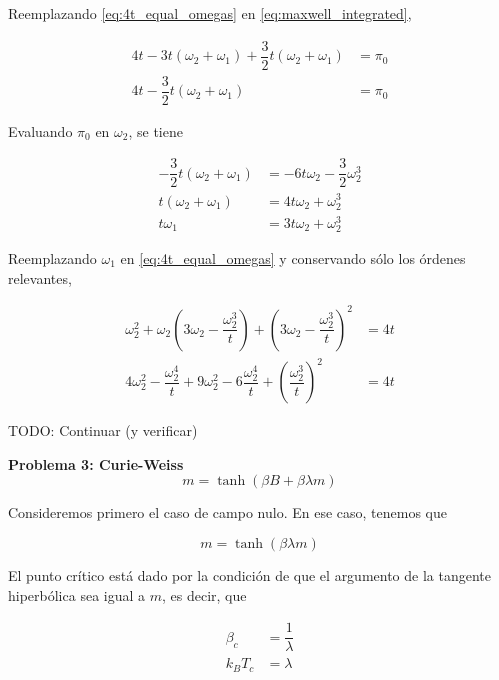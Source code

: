 \documentclass[10pt]{article}
\begin{document}
Reemplazando \ref{eq:4t_equal_omegas} en \ref{eq:maxwell_integrated},

\begin{align}
4t - 3t(\omega_2 + \omega_1) + \dfrac{3}{2} t (\omega_2 + \omega_1) &= \pi_0 \nonumber \\
4t - \dfrac{3}{2} t (\omega_2 + \omega_1) &= \pi_0
\end{align}

Evaluando $\pi_0$ en $\omega_2$, se tiene

\begin{align}
 -\dfrac{3}{2} t (\omega_2 + \omega_1) &= -6t\omega_2 -\dfrac{3}{2}\omega_2^3 \nonumber \\
t (\omega_2 + \omega_1) &= 4t\omega_2 + \omega_2^3 \nonumber \\
t \omega_1  &= 3 t \omega_2 + \omega_2^3 \nonumber \label{eq:t_omega1}
\end{align}

Reemplazando $\omega_1$ en  \ref{eq:4t_equal_omegas} y conservando s\'olo los \'ordenes relevantes,

\begin{align}
  \omega_2^2+\omega_2 \left( 3 \omega_2 - \dfrac{\omega_2^3}{t} \right) + \left(3 \omega_2 - \dfrac{\omega_2^3}{t} \right)^2 &= 4t \nonumber \\
  4 \omega_2^2 - \dfrac{\omega_2^4}{t} + 9 \omega_2^2 - 6 \dfrac{\omega_2^4}{t} + \left( \dfrac{\omega_2^3}{t} \right)^2 &= 4t 
\end{align}

TODO: Continuar (y verificar)


\pagebreak

\textbf{Problema 3: Curie-Weiss}
\\

\begin{equation} \label{eq:Curie_Weiss}
m = \tanh (\beta B + \beta \lambda m)
\end{equation}

Consideremos primero el caso de campo nulo. En ese caso, tenemos que 

\begin{equation} \label{eq:Curie_Weiss_B0}
m = \tanh (\beta \lambda m)
\end{equation}

El punto cr\'itico est\'a dado por la condici\'on de que el argumento de la tangente hiperb\'olica sea igual a $m$, es decir, que

\begin{align}
\beta_c &= \dfrac{1}{\lambda} \nonumber \\
k_B T_c &= \lambda \nonumber
\end{align}
\end{document}
